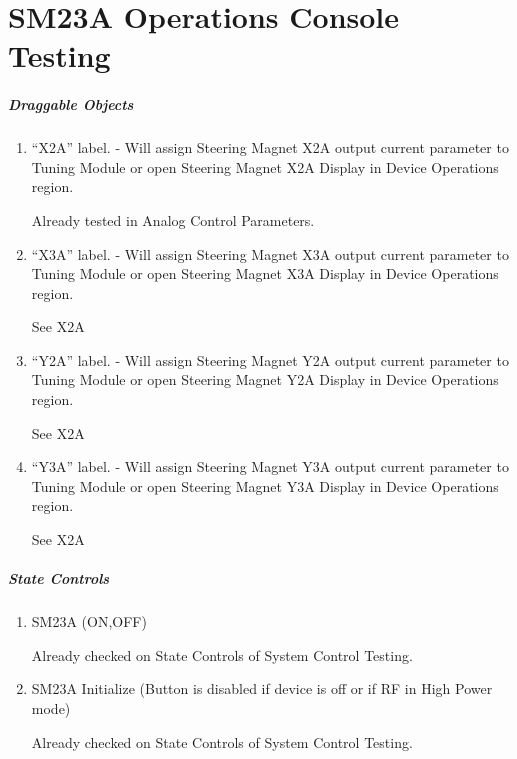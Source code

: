 \documentclass[11pt]{book}		%
\begin{document}
\chapter{SM23A Operations Console Testing}

\paragraph{Draggable Objects}

\begin{enumerate}
 \item ``X2A'' label. - Will assign Steering Magnet X2A output current parameter to Tuning Module or open Steering Magnet X2A Display in Device Operations region.

\color{red}
Already tested in Analog Control Parameters.
\color{black}

 \item ``X3A'' label. - Will assign Steering Magnet X3A output current parameter to Tuning Module or open Steering Magnet X3A Display in Device Operations region.

\color{red}
See X2A
\color{black}

 \item ``Y2A'' label. - Will assign Steering Magnet Y2A output current parameter to Tuning Module or open Steering Magnet Y2A Display in Device Operations region.

\color{red}
See X2A
\color{black}

 \item ``Y3A'' label. - Will assign Steering Magnet Y3A output current parameter to Tuning Module or open Steering Magnet Y3A Display in Device Operations region.

\color{red}
See X2A
\color{black}

\end{enumerate}

\paragraph{State Controls}

\begin{enumerate}
 \item SM23A (ON,OFF)

\color{red}
Already checked on State Controls of System Control Testing.
\color{black}

 \item SM23A Initialize (Button is disabled if device is off or if RF in High Power mode)

\color{red}
Already checked on State Controls of System Control Testing.
\color{black}

\end{enumerate}
\end{document}
